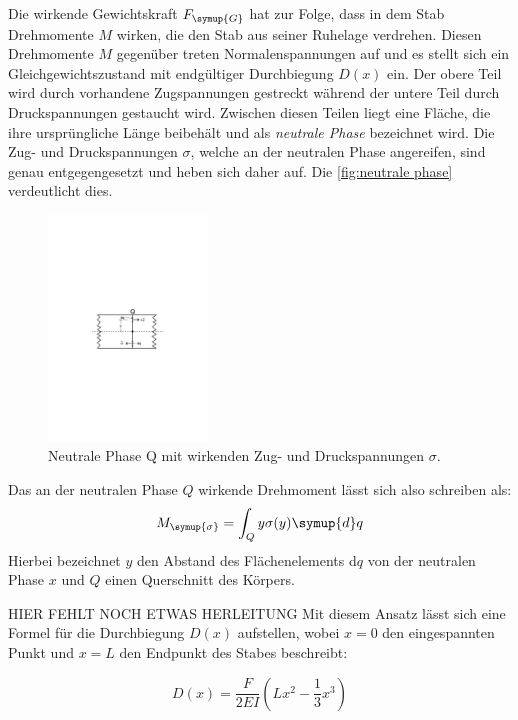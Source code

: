 Die wirkende Gewichtskraft $F_{\symup{G}}$ hat zur Folge, dass in dem Stab Drehmomente $M$ wirken, die den Stab aus seiner 
Ruhelage verdrehen. Diesen Drehmomente $M$ gegenüber treten Normalenspannungen auf und es stellt sich ein 
Gleichgewichtszustand mit endgültiger Durchbiegung $D(x)$ ein. Der obere Teil wird durch vorhandene Zugspannungen 
gestreckt während der untere Teil durch Druckspannungen gestaucht wird. Zwischen diesen Teilen liegt eine Fläche, die 
ihre ursprüngliche Länge beibehält und als \textit{neutrale Phase} bezeichnet wird. Die Zug- und Druckspannungen $\sigma$, 
welche an der neutralen Phase angereifen, sind genau entgegengesetzt und heben sich daher auf. 
Die \autoref{fig:neutrale phase} verdeutlicht dies.

\begin{figure} [H]
    \centering
    \includegraphics[height=6cm]{content/Abbildungen/neutrale_phase.pdf}
    \caption{Neutrale Phase Q mit wirkenden Zug- und Druckspannungen $\sigma$. \cite{v103}}
    \label{fig:neutrale phase}
\end{figure}

Das an der neutralen Phase $Q$ wirkende Drehmoment lässt sich also schreiben als:
\begin{equation}
    M_{\symup{\sigma}}=\int_{Q}y\sigma(y)\symup{d}q
    \label{eq:drehmoment neutrale phase}
\end{equation}
Hierbei bezeichnet $y$ den Abstand des Flächenelements d$q$ von der neutralen Phase $x$ und $Q$ einen Querschnitt des Körpers.

HIER FEHLT NOCH ETWAS HERLEITUNG %
Mit diesem Ansatz lässt sich eine Formel für die Durchbiegung $D(x)$ aufstellen, wobei $x=0$ den eingespannten Punkt
und $x=L$ den Endpunkt des Stabes beschreibt:

\begin{equation}
    D(x)=\frac{F}{2EI}(Lx^{2}-\frac{1}{3}x^{3})
    \label{eq:Durchbiegung einseitig}
\end{equation}

